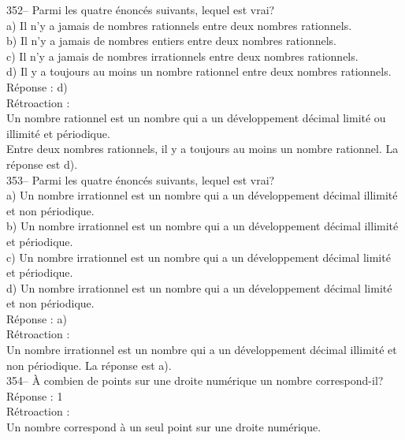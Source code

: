 ﻿\documentclass[letterpaper, 12pt]{article}
\begin{document}
352-- Parmi les quatre \'enonc\'es suivants, lequel est vrai?\\
a) Il n'y a jamais de nombres rationnels entre deux nombres rationnels.\\
b) Il n'y a jamais de nombres entiers entre deux nombres rationnels.\\
c) Il n'y a jamais de nombres irrationnels entre deux nombres rationnels.\\
d) Il y a toujours au moins un nombre rationnel entre deux nombres
rationnels.\\

R\'eponse : d)\\

R\'etroaction :\\
Un nombre rationnel est un nombre qui a un d\'eveloppement d\'ecimal
limit\'e ou illimit\'e et p\'eriodique.\\
Entre deux nombres rationnels, il y a toujours au moins un nombre rationnel.
  La r\'eponse est d).\\

353-- Parmi les quatre \'enonc\'es suivants, lequel est vrai?\\
a) Un nombre irrationnel est un nombre qui a un d\'eveloppement d\'ecimal
illimit\'e et non p\'eriodique.\\
b) Un nombre irrationnel est un nombre qui a un d\'eveloppement d\'ecimal
illimit\'e et p\'eriodique.\\
c) Un nombre irrationnel est un nombre qui a un d\'eveloppement d\'ecimal
limit\'e et p\'eriodique.\\
d) Un nombre irrationnel est un nombre qui a un d\'eveloppement d\'ecimal
limit\'e et non p\'eriodique.\\

R\'eponse : a)\\

R\'etroaction : \\
Un nombre irrationnel est un nombre qui a un d\'eveloppement d\'ecimal
illimit\'e et non p\'eriodique.  La r\'eponse est a).\\

354-- \`A combien de points sur une droite num\'erique un nombre
correspond-il?\\

R\'eponse : 1\\

R\'etroaction : \\
Un nombre correspond \`a un seul point sur une droite num\'erique.\\
\end{document}
